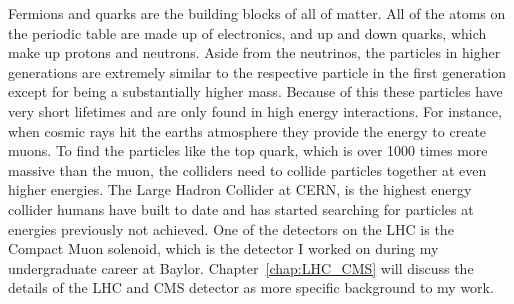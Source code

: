 Fermions and quarks are the building blocks of all of matter. All of the atoms on the periodic table are made up of electronics, and up and down quarks, which make up protons and neutrons. Aside from the neutrinos, the particles in higher generations are extremely similar to the respective particle in the first generation except for being a substantially higher mass. Because of this these particles have very short lifetimes and are only found in high energy interactions. For instance, when cosmic rays hit the earths atmosphere they provide the energy to create muons. To find the particles like the top quark, which is over 1000 times more massive than the muon, the colliders need to collide particles together at even higher energies. The Large Hadron Collider at CERN, is the highest energy collider humans have built to date and has started searching for particles at energies previously not achieved. One of the detectors on the LHC is the Compact Muon solenoid, which is the detector I worked on during my undergraduate career at Baylor. Chapter~\ref{chap:LHC_CMS} will discuss the details of the LHC and CMS detector as more specific background to my work. 